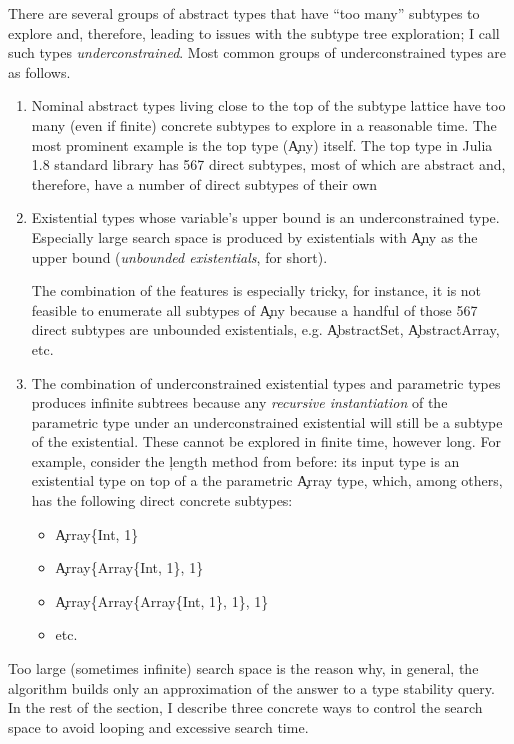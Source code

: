 There are several groups of abstract types that have ``too many'' subtypes to explore
and, therefore, leading to issues with the subtype tree exploration; I call such
types \emph{underconstrained}. Most common groups of underconstrained types are
as follows.
\begin{enumerate}

  \item Nominal abstract types living close to the top of the subtype lattice
    have too many (even if finite) concrete subtypes to explore in a reasonable time.
    The most prominent example is the top type (\c{Any}) itself.
    The top type in Julia 1.8 standard library has 567 direct subtypes, most of
    which are abstract and, therefore, have a number of direct subtypes of
    their own

  \item Existential types whose variable's upper bound is an underconstrained
    type. Especially large search space is produced by existentials with \c{Any}
    as the upper bound (\emph{unbounded existentials}, for short).

    The combination of the features is especially tricky, for instance, it is
    not feasible to enumerate all subtypes of \c{Any} because a handful of those
    567 direct subtypes are unbounded existentials, e.g. \c{AbstractSet},
    \c{AbstractArray}, etc.

  \item The combination of underconstrained existential types and parametric
    types produces infinite subtrees because any \emph{recursive instantiation}
    of the parametric type under an underconstrained existential will still be a
    subtype of the existential. These cannot be explored in finite time, however
    long. For example, consider the \c{length} method from before: its input
    type is an existential type on top of a the parametric \c{Array} type,
    which, among others, has the following direct concrete subtypes:
    \begin{itemize}
      \item \c{Array\{Int, 1\}}
      \item \c{Array\{Array\{Int, 1\}, 1\}}
      \item \c{Array\{Array\{Array\{Int, 1\}, 1\}, 1\}}
      \item etc.
    \end{itemize}

\end{enumerate}

Too large (sometimes infinite) search space is the reason why, in general,
the algorithm builds only an approximation of the answer to a type stability query.
In the rest of the section, I describe three concrete ways to control the search
space to avoid looping and excessive search time.

